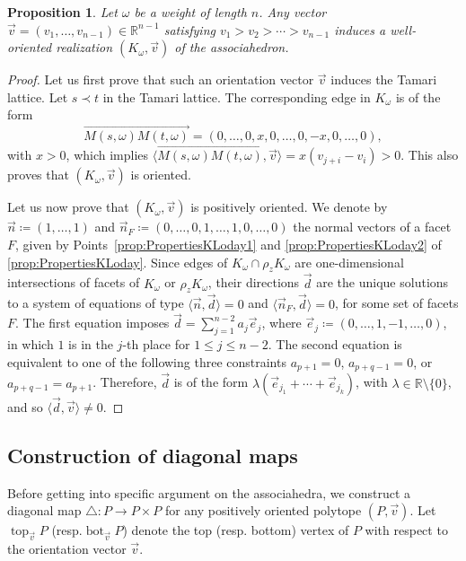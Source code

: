 \documentclass[11pt]{article}
\newcommand{\resp}{resp.\xspace}
\numberwithin{equation}{section}\providecommand{\No}{}
\theoremstyle{plain}
\newtheorem{proposition}{Proposition}
\theoremstyle{definition}
\newcommand{\RR}{\mathbb{R}}
\newcommand{\K}{{K}}
\DeclareMathOperator{\tp}{top}
\DeclareMathOperator{\bm}{bot}
\newcommand{\ang}[1]{\langle #1\rangle}
\begin{document}
\begin{proposition}\label{prop:OrientationVector}
Let $\omega$ be a weight of length $n$.
Any vector $\vec v=(v_1, \ldots, v_{n-1})\in \RR^{n-1}$ satisfying $v_1>v_2>\cdots >v_{n-1}$ induces a
well-oriented realization $(\K_\omega, \vec v)$ of the associahedron.
\end{proposition}

\begin{proof}
Let us first prove that such an orientation vector $\vec v$ induces the Tamari lattice.
Let $s\prec t$ in the Tamari lattice. The corresponding edge in $\K_\omega$ is of the form
\[\overrightarrow{M(s,\omega)M(t,\omega)}=(0, \ldots, 0, x, 0, \ldots, 0, -x, 0, \ldots, 0), \]
with $x>0$, which implies
$\big\langle\overrightarrow{M(s,\omega)M(t,\omega)}, \vec v\big\rangle= x(v_{j+i}-v_i)>0$.
This also proves that $(K_\omega,\vec v)$ is oriented.

Let us now prove that $(\K_\omega,\vec v)$ is positively oriented.
We denote by $\vec n\coloneqq (1, \ldots, 1)$ and $\vec n_F\coloneqq (0, \ldots, 0,\allowbreak {1}, \ldots, {1}, 0, \ldots, 0)$ the normal vectors of a facet $F$, given by Points~\eqref{prop:PropertiesKLoday1} and \eqref{prop:PropertiesKLoday2} of \cref{prop:PropertiesKLoday}.
Since edges of $\K_\omega\cap \rho_z \K_\omega$
are one-dimensional intersections of facets of
$\K_\omega$ or $\rho_z \K_\omega$, their directions $\vec d$ are the unique solutions to a system of equations of type $\langle \vec n, \vec d\rangle=0$ and $\langle \vec n_F, \vec d\rangle=0$, for some set of facets $F$.
The first equation imposes $\vec d=\sum_{j=1}^{n-2} a_j \vec e_j$, where
$\vec e_j\coloneqq (0, \ldots, 1, -1, \ldots, 0)$, in which $1$ is in the $j$-th place for $1\leq j\leq n-2$.
The second equation is equivalent to one of the following three constraints
$a_{p+1}=0$, $a_{p+q-1}=0$, or $a_{p+q-1}=a_{p+1}$.
Therefore, $\vec d$ is of the form $\lambda\left(\vec e_{j_1}+\cdots +\vec e_{j_k}\right)$, with $\lambda \in \RR\setminus \{0\}$, and so
$\ang{\vec d, \vec v}\neq 0$.
\end{proof}

\subsection{Construction of diagonal maps}

Before getting into specific argument on the associahedra, we construct a diagonal map $\triangle: P\to P\times P$ for any positively oriented polytope $(P, \vec v)$. Let $\tp_{\vec v} P$ (\resp $\bm_{\vec v} P$) denote the top (\resp bottom) vertex of $P$ with respect to the orientation vector $\vec v$.
\end{document}
